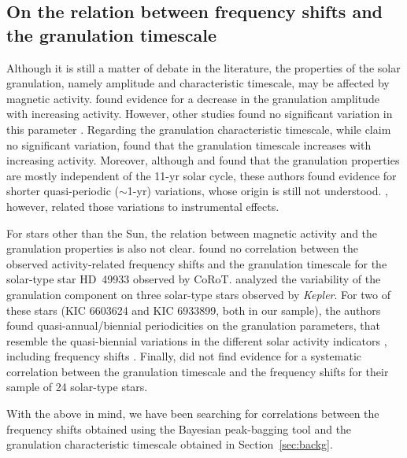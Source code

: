 \documentclass[twocolumn]{aastex61}%
\begin{document}
\subsection{On the relation between frequency shifts and the granulation timescale}\label{sec:gran}

Although it is still a matter of debate in the literature, the properties of the solar granulation, namely amplitude and characteristic timescale, may be affected by magnetic activity. \citet{Muller2007} found evidence for a decrease in the granulation amplitude with increasing activity. However, other studies found no significant variation in this parameter \citep{Palle1995,Regulo2002,Regulo2005,Lefebvre2008,Karoff2012}. Regarding the granulation characteristic timescale, while \citet{Lefebvre2008} claim no significant variation, \citet{Regulo2002,Regulo2005} found that the granulation timescale increases with increasing activity. Moreover, although \citet{Lefebvre2008} and \citet{Karoff2012} found that the granulation properties are mostly independent of the 11-yr solar cycle, these authors found evidence for shorter quasi-periodic ($\sim$1-yr) variations, whose origin is still not understood. \citet{Lefebvre2008}, however, related those variations to instrumental effects.

For stars other than the Sun, the relation between magnetic activity and the granulation properties is also not clear. \citet{Garcia2010} found no correlation between the observed activity-related frequency shifts and the granulation timescale for the solar-type star HD~49933 observed by CoRoT. \citet{Karoff2013} analyzed the variability of the granulation component on three solar-type stars observed by {\it Kepler}. For two of these stars (KIC 6603624 and KIC 6933899, both in our sample), the authors found quasi-annual/biennial periodicities on the granulation parameters, that resemble the quasi-biennial variations in the different solar activity indicators \citep{Bazilevskaya2014,McIntosh2015,Salabert2017}, including frequency shifts \citep{Fletcher2010,Broomhall2012,Broomhall2015}. Finally, \citet{Kiefer2017} did not find evidence for a systematic correlation between the granulation timescale and the frequency shifts for their sample of 24 solar-type stars.

With the above in mind, we have been searching for correlations between the frequency shifts obtained using the Bayesian peak-bagging tool and the granulation characteristic timescale obtained in Section~\ref{sec:backg}. 
\end{document}
